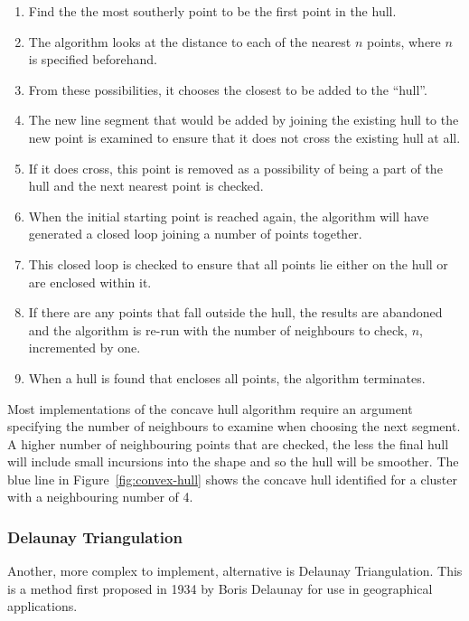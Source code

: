 \begin{enumerate}
	\item Find the the most southerly point to be the first point in the hull.
	\item The algorithm looks at the distance to each of the nearest $n$
		points, where $n$ is specified beforehand.
	\item From these possibilities, it chooses the closest to be added to the
		``hull''.
	\item The new line segment that would be added by joining the existing hull
		to the new point is examined to ensure that it does not cross the
		existing hull at all.
	\item If it does cross, this point is removed as a possibility of being a
		part of the hull and the next nearest point is checked.
	\item When the initial starting point is reached again, the algorithm will
		have generated a closed loop joining a number of points together.
	\item This closed loop is checked to ensure that all points lie either on
		the hull or are enclosed within it.
	\item If there are any points that fall outside the hull, the results are
		abandoned and the algorithm is re-run with the number of neighbours to
		check, $n$, incremented by one.
	\item When a hull is found that encloses all points, the algorithm
		terminates.
\end{enumerate}

Most implementations of the concave hull algorithm require an argument
specifying the number of neighbours to examine when choosing the next segment.
A higher number of neighbouring points that are checked, the less the final
hull will include small incursions into the shape and so the hull will be
smoother. The blue line in Figure~\ref{fig:convex-hull} shows the concave hull
identified for a cluster with a neighbouring number of 4.

\cite{lee2002polygonization}

\cite{estivill2000autoclust}

\cite{xia2006border}

\subsubsection*{Delaunay Triangulation}
\label{ssub:Delaunay Triangulation}

Another, more complex to implement, alternative is Delaunay
Triangulation\cite{delaunay1934sphere}. This is a method first proposed in 1934
by Boris Delaunay for use in geographical applications.

